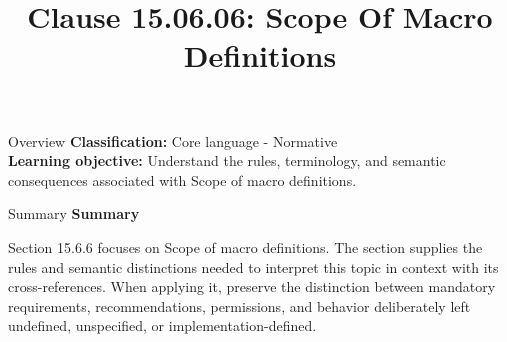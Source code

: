 \documentclass[10pt,letterpaper]{article}
\title{Clause 15.06.06: Scope Of Macro Definitions}
\author{}
\date{}
\begin{document}
\maketitle
\begin{CornellOverviewBox}{Overview}
\textbf{Classification:} Core language - Normative\\[2pt]
\textbf{Learning objective:} Understand the rules, terminology, and semantic consequences associated with Scope of macro definitions.
\end{CornellOverviewBox}\begin{CornellSummaryBox}{Summary}
{\sffamily\bfseries\color{Accent} Summary}\par\vspace{3pt}Section 15.6.6 focuses on Scope of macro definitions. The section supplies the rules and semantic distinctions needed to interpret this topic in context with its cross-references. When applying it, preserve the distinction between mandatory requirements, recommendations, permissions, and behavior deliberately left undefined, unspecified, or implementation-defined.
\end{CornellSummaryBox}
\end{document}
